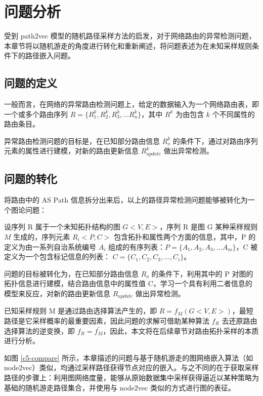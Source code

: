\section{问题分析}


受到 path2vec 模型的随机路径采样方法的启发，对于网络路由的异常检测问题，本章节将以随机游走的角度进行转化和重新阐述，将问题表述为在未知采样规则条件下的路径嵌入问题。

\subsection{问题的定义}

一般而言，在网络的异常路由检测问题上，给定的数据输入为一个网络路由表，即一个或多个路由序列 $R=\{R_1^k, R_2^k, R_3^k, ... R_n^k\}$，其中 $R^k$ 为由包含 $k$ 个不同属性的路由条目。

异常路由检测问题的目标是，在已知部分路由信息 $R_o^k$ 的条件下，通过对路由序列元素的属性进行建模，对新的路由更新信息 $R_{update}^k$ 做出异常检测。

\subsection{问题的转化}

将路由中的 AS Path 信息拆分出来后，以上的路径异常检测问题能够被转化为一个图论问题：

设序列 R 属于一个未知拓扑结构的图 $G<V,E>$，序列 R 是图 G 某种采样规则 $M$ 生成的，序列元素 $R_i<P,C>$ 包含拓扑和属性两个方面的信息，其中，P 的定义为由一系列自治系统编号 $A_i$ 组成的有序列表：$P=\{A_1, A_2, A_3, ... A_m\}$，C 被定义为一个包含标记信息的列表： $C=\{C_1, C_2, C_3,...,C_i\}$。

问题的目标被转化为，在已知部分路由信息 $R_o$ 的条件下，利用其中的 P 对图的拓扑信息进行建模，结合路由信息中的属性值 C，学习一个具有利用二者信息的模型来反应，对新的路由更新信息 $R_{update}$ 做出异常检测。

已知采样规则 M 是通过路由选择算法产生的，即 $R=f_M(G<V,E>)$，最短路径是它采样概率的最重要因素，因此问题的求解可借助某种算法 $f_R$ 去还原路由选择算法的逆变换，即 $f_R = \bar{f_M}$，因此，本文将在后续章节对路由拓扑采样的本质进行分析。

如图 \ref{c5-compare} 所示，本章描述的问题与基于随机游走的图网络嵌入算法（如 node2vec）类似，均通过采样路径获得节点对应的嵌入。与之不同的在于获取采样路径的步骤上：利用图网络度量，能够从原始数据集中采样获得逼近以某种策略为基础的随机游走路径集合，并使用与 node2vec 类似的方式进行图的表征。

